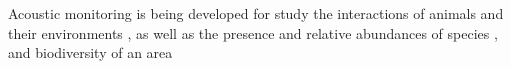 
Acoustic monitoring is being developed for study the interactions of animals and their environments \citep{blumstein2011acoustic, straight2014passive, marcoux2011local, rogers2013density}, as well as the presence and relative abundances of species \citep{mckown2012wireless, marcoux2011local}, and biodiversity of an area \citep{ depraetere2012monitoring}





